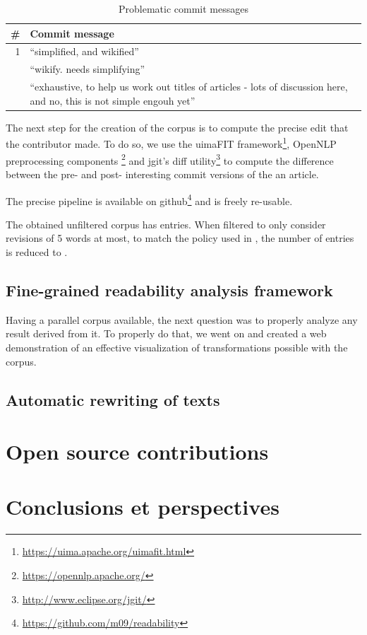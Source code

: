 \documentclass[a4paper, 11pt]{scrreprt}
\begin{document}
\begin{table}[H]
  \centering
  \caption{Problematic commit messages}
  \begin{tabular}{rp{12cm}}
    \toprule
    \# & Commit message \\
    \midrule
    1 & “simplified, and wikified” \\
    \addlinespace
    2 & “wikify. needs simplifying” \\
    \addlinespace
    3 & “exhaustive, to help us work out titles of articles - lots of
    discussion here, and no, this is not simple engouh yet” \\
  \end{tabular}
  \label{tab:problematic-commits}
\end{table}

The next step for the creation of the corpus is to compute the precise
edit that the contributor made. To do so, we use the uimaFIT
framework\footnote{\url{https://uima.apache.org/uimafit.html}},
OpenNLP preprocessing components
\footnote{\url{https://opennlp.apache.org/}} and jgit's diff
utility\footnote{\url{http://www.eclipse.org/jgit/}} to compute the
difference between the pre- and post- interesting commit versions of
the an article.

The precise pipeline is available on
github\footnote{\url{https://github.com/m09/readability}} and is freely
re-usable.

The obtained unfiltered corpus has  entries. When
filtered to only consider revisions of 5 words at most, to match the
policy used in \cite{yatskar2010sake}, the number of entries is
reduced to .

\section{Fine-grained readability analysis framework}
\label{sec:framework}

Having a parallel corpus available, the next question was to properly
analyze any result derived from it. To properly do that, we went on
and created a web demonstration of an effective visualization of
transformations possible with the corpus.

\section{Automatic rewriting of texts}
\label{sec:rewriting}

\chapter{Open source contributions}
\label{cha:oss-contribs}


\chapter{Conclusions  et perspectives}



\end{document}
